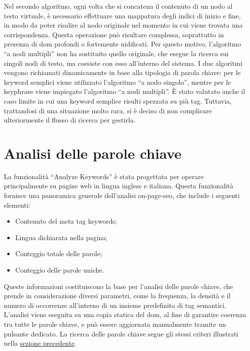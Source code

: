 \vspace{10pt}
\par\noindent Nel secondo algoritmo, ogni volta che si concatena il contenuto di un nodo al testo virtuale, è necessario effettuare una mappatura degli indici di inizio e fine, in modo da poter risalire al nodo originale nel momento in cui viene trovata una corrispondenza. Questa operazione può risultare complessa, soprattutto in presenza di \gls{dom} profondi o fortemente nidificati. Per questo motivo, l’algoritmo “a nodi multipli” non ha sostituito quello originale, che esegue la ricerca sui singoli nodi di testo, ma coesiste con esso all’interno del sistema. I due algoritmi vengono richiamati dinamicamente in base alla tipologia di parola chiave: per le keyword semplici viene utilizzato l’algoritmo “a nodo singolo”, mentre per le keyphrase viene impiegato l’algoritmo “a nodi multipli”. È stato valutato anche il caso limite in cui una keyword semplice risulti spezzata su più tag. Tuttavia, trattandosi di una situazione molto rara, si è deciso di non complicare ulteriormente il flusso di ricerca per gestirla.

\section{Analisi delle parole chiave}
\label{sec:analyze-keyword}

\par La funzionalità “Analyze Keywords” è stata progettata per operare principalmente su pagine web in lingua inglese e italiana. Questa funzionalità fornisce una panoramica generale dell'analisi \gls{on-page-seo}, che include i seguenti elementi:
\begin{itemize}
  \item Contenuto del meta tag keywords;
  \item Lingua dichiarata nella pagina;
  \item Conteggio totale delle parole;
  \item Conteggio delle parole uniche.
\end{itemize}

\vspace{10pt}
\par\noindent Queste informazioni costituiscono la base per l'analisi delle parole chiave, che prende in considerazione diversi parametri, come la frequenza, la densità e il numero di occorrenze all’interno di un insieme predefinito di tag semantici. L'analisi viene eseguita su una copia statica del \gls{dom}, al fine di garantire coerenza tra tutte le parole chiave, e può essere aggiornata manualmente tramite un pulsante dedicato. La ricerca delle parole chiave segue gli stessi criteri illustrati nella \hyperref[sec:highlight-keyword]{sezione precedente}.

